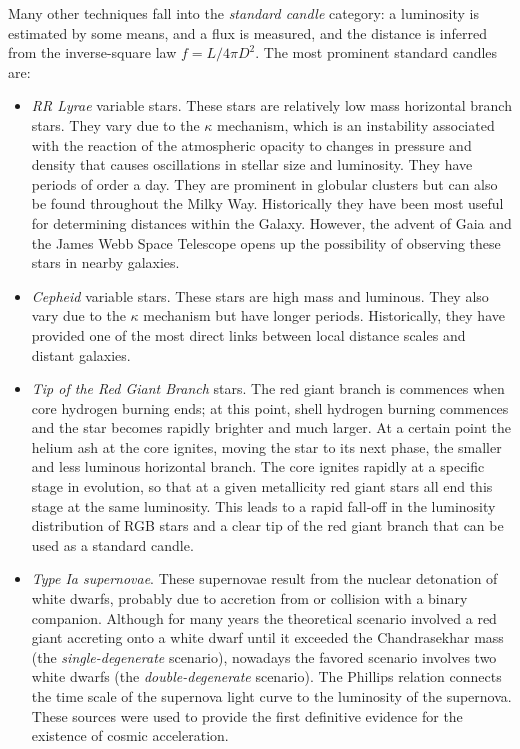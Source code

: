 Many other techniques fall into the {\it standard candle} category: a
luminosity is estimated by some means, and a flux is measured, and the
distance is inferred from the inverse-square law $f=L/4\pi D^2$.  The
most prominent standard candles are:
\begin{itemize}
\item {\it RR Lyrae} variable stars. These stars are relatively low mass
  horizontal branch stars. They vary due to the $\kappa$ mechanism,
  which is an instability associated with the reaction of the
  atmospheric opacity to changes in pressure and density that causes
  oscillations in stellar size and luminosity.  They have periods of
  order a day. They are prominent in globular clusters but can also be
  found throughout the Milky Way. Historically they have been most
  useful for determining distances within the Galaxy. However, the
  advent of Gaia and the James Webb Space Telescope opens up the
  possibility of observing these stars in nearby galaxies.
\item {\it Cepheid} variable stars. These stars are high mass and
  luminous.  They also vary due to the $\kappa$ mechanism but have
  longer periods. Historically, they have provided one of the most
  direct links between local distance scales and distant galaxies.
\item {\it Tip of the Red Giant Branch} stars. The red giant branch is
  commences when core hydrogen burning ends; at this point, shell
  hydrogen burning commences and the star becomes rapidly brighter and
  much larger. At a certain point the helium ash at the core ignites,
  moving the star to its next phase, the smaller and less luminous
  horizontal branch. The core ignites rapidly at a specific stage in
  evolution, so that at a given metallicity red giant stars all end
  this stage at the same luminosity. This leads to a rapid fall-off in
  the luminosity distribution of RGB stars and a clear tip of the red
  giant branch that can be used as a standard candle.
\item {\it Type Ia supernovae}. These supernovae result from the
  nuclear detonation of white dwarfs, probably due to accretion from
  or collision with a binary companion. Although for many years the
  theoretical scenario involved a red giant accreting onto a white
  dwarf until it exceeded the Chandrasekhar mass (the {\it
  single-degenerate} scenario), nowadays the favored scenario involves
  two white dwarfs (the {\it double-degenerate} scenario). The
  Phillips relation connects the time scale of the supernova light
  curve to the luminosity of the supernova. These sources were used to
  provide the first definitive evidence for the existence of cosmic
  acceleration.
\end{itemize}

